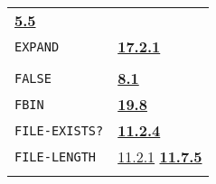 \documentclass[a4paper,]{article}
\begin{document}
\begin{longtable}[]{@{}ll@{}}
\begin{minipage}[t]{0.70\columnwidth}
\textbf{\href{05-simple-functions.md\#55-examples-comments-1}{5.5}}\strut
\end{minipage}\tabularnewline
\begin{minipage}[t]{0.24\columnwidth}\raggedright\strut
\texttt{EXPAND}\strut
\end{minipage} & \begin{minipage}[t]{0.70\columnwidth}\raggedright\strut
\textbf{\href{17-macro-operations.md\#1721-defmac-and-expand}{17.2.1}}\strut
\end{minipage}\tabularnewline
\begin{minipage}[t]{0.24\columnwidth}\raggedright\strut
\strut
\end{minipage} & \begin{minipage}[t]{0.70\columnwidth}\raggedright\strut
\strut
\end{minipage}\tabularnewline
\begin{minipage}[t]{0.24\columnwidth}\raggedright\strut
\texttt{FALSE}\strut
\end{minipage} & \begin{minipage}[t]{0.70\columnwidth}\raggedright\strut
\textbf{\href{08-truth.md\#81-truth-values-1}{8.1}}\strut
\end{minipage}\tabularnewline
\begin{minipage}[t]{0.24\columnwidth}\raggedright\strut
\texttt{FBIN}\strut
\end{minipage} & \begin{minipage}[t]{0.70\columnwidth}\raggedright\strut
\textbf{\href{19-compiled-programs.md\#198-rsubrs-in-files}{19.8}}\strut
\end{minipage}\tabularnewline
\begin{minipage}[t]{0.24\columnwidth}\raggedright\strut
\texttt{FILE-EXISTS?}\strut
\end{minipage} & \begin{minipage}[t]{0.70\columnwidth}\raggedright\strut
\textbf{\href{11-input-output.md\#1124-file-exists}{11.2.4}}\strut
\end{minipage}\tabularnewline
\begin{minipage}[t]{0.24\columnwidth}\raggedright\strut
\texttt{FILE-LENGTH}\strut
\end{minipage} & \begin{minipage}[t]{0.70\columnwidth}\raggedright\strut
\href{11-input-output.md\#1121-open}{11.2.1} \textbf{\href{11-input-output.md\#1175-file-length}{11.7.5}}\strut
\end{minipage}\tabularnewline
\begin{minipage}[t]{0.24\columnwidth}\raggedright\strut

\end{minipage}
\end{longtable}
\end{document}
